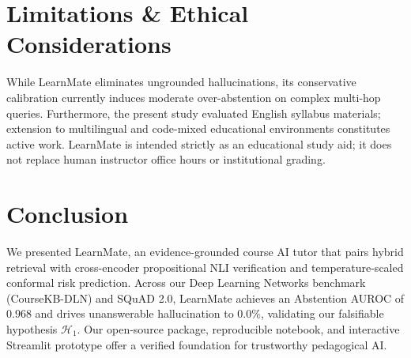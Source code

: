 \documentclass[10pt,twocolumn,letterpaper]{article}
\begin{document}
\section{Limitations \& Ethical Considerations}
While LearnMate eliminates ungrounded hallucinations, its conservative calibration currently induces moderate over-abstention on complex multi-hop queries. Furthermore, the present study evaluated English syllabus materials; extension to multilingual and code-mixed educational environments constitutes active work. LearnMate is intended strictly as an educational study aid; it does not replace human instructor office hours or institutional grading.

\section{Conclusion}
We presented LearnMate, an evidence-grounded course AI tutor that pairs hybrid retrieval with cross-encoder propositional NLI verification and temperature-scaled conformal risk prediction. Across our Deep Learning Networks benchmark (CourseKB-DLN) and SQuAD 2.0, LearnMate achieves an Abstention AUROC of $0.968$ and drives unanswerable hallucination to $0.0\%$, validating our falsifiable hypothesis $\mathcal{H}_1$. Our open-source package, reproducible notebook, and interactive Streamlit prototype offer a verified foundation for trustworthy pedagogical AI.



\end{document}
